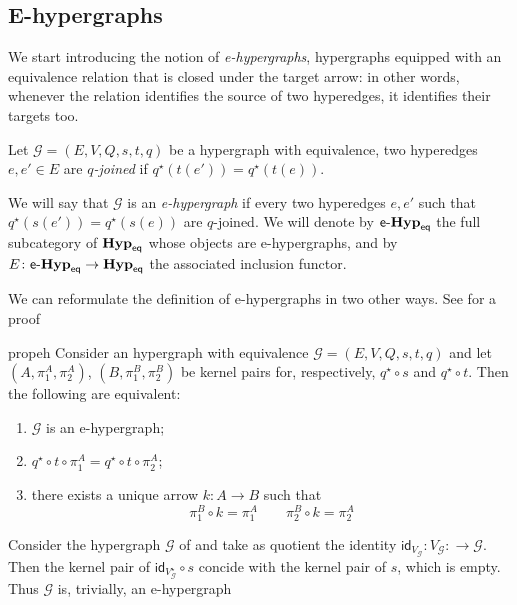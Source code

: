 \documentclass[3p]{elsarticle}
\newcommand{\eq}{\mathsf{eq}}
\newcommand{\catname}[1]{\textbf{\textup{#1}}}
\newcommand{\EqHyp}{\catname{Hyp}_{\mathsf{eq}}} %
\newcommand{\egg}{\mathsf{e}\text{-}\catname{Hyp}_\eq}
\newcommand{\id}[1]{\mathsf{id}_{#1}}
\theoremstyle{remark}
\theoremstyle{definition}
\begin{document}
\subsection{E-hypergraphs}

We start introducing the notion of \emph{e-hypergraphs}, hypergraphs equipped with an equivalence relation that is closed under the target arrow:
in other words, whenever the relation identifies the source of two hyperedges, it identifies their targets too.

\begin{defi}
Let $\mathcal{G} = (E, V, Q, s, t, q)$ be a hypergraph with equivalence, two  hyperedges $e, e'\in E$ are \emph{$q$-joined} if $q^\star(t(e'))=q^\star(t(e))$.
 
We will say that $\mathcal{G}$ is an \emph{e-hypergraph} if every two  hyperedges $e,e'$ such that
$q^\star(s(e'))=q^\star(s(e))$ are $q$-joined.
We will denote by $\egg$ the full subcategory of $\EqHyp$ whose objects are e-hypergraphs, and by $E\colon \egg \to \EqHyp$ the associated inclusion functor. 
\end{defi}

We can reformulate the definition of e-hypergraphs in two other ways. See  for a proof

\begin{restatable}{prop}{eh}\label{prop:eh}
Consider an hypergraph with equivalence $\mathcal{G} = (E, V, Q, s, t, q)$ and let $(A, \pi^A_1, \pi^A_2)$, $(B, \pi^B_1, \pi^B_2)$ be kernel pairs for, respectively, $q^\star\circ s$ and $q^\star\circ t$. Then the following are equivalent:
\begin{enumerate}
	\item $\mathcal{G}$ is an e-hypergraph;
	\item $q^\star\circ t\circ \pi^A_1=q^\star\circ t\circ \pi^A_2$;
	\item there exists a unique arrow $k\colon A\to B$ such that 
	\[\pi^B_1\circ k = \pi^A_1 \qquad \pi^B_2\circ k = \pi^A_2 \]
	\end{enumerate}\end{restatable}


\begin{exa}
	Consider the hypergraph $\mathcal{G}$ of  and take as quotient the identity $\id{V_\mathcal{G}}\colon V_\mathcal{G}\colon \to\mathcal{G}$. Then the kernel pair of $\id{V^\star_\mathcal{G}} \circ s$ concide with the kernel pair of $s$, which is empty. Thus  $\mathcal{G}$ is, trivially, an e-hypergraph
\end{exa}
\end{document}
